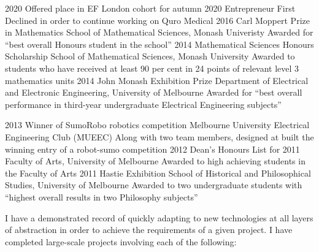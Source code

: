 \documentclass[9pt]{developercv} %
\newcommand{\CPP}
{C\nolinebreak[4]\hspace{-.05em}\raisebox{.22ex}{++ }}
\begin{document}
\begin{entrylist}
  \entry
    {2020}
    {Offered place in EF London cohort for autumn 2020}
    {Entrepreneur First}
    {Declined in order to continue working on Quro Medical}
  \entry
    {2016}
    {Carl Moppert Prize in Mathematics}
    {School of Mathematical Sciences, Monash Univeristy}
    {Awarded for ``best overall Honours student in the school''}
  \entry
    {2014}
    {Mathematical Sciences Honours Scholarship}
    {School of Mathematical Sciences, Monash University}
    {Awarded to students who have received at least 90 per cent in 24 points of relevant level 3 mathematics units}
  \entry
    {2014}
    {John Monash Exhibition Prize}
    {Department of Electrical and Electronic Engineering, University of Melbourne}
    {Awarded for ``best overall performance in third-year undergraduate Electrical Engineering subjects''}

  \entry
    {2013}
    {Winner of SumoRobo robotics competition}
    {Melbourne University Electrical Engineering Club (MUEEC)}
    {Along with two team members, designed at built the winning entry of a robot-sumo competition}
  \entry
    {2012}
    {Dean's Honours List for 2011}
    {Faculty of Arts, University of Melbourne}
    {Awarded to high achieving students in the Faculty of Arts}
  \entry
    {2011}
    {Hastie Exhibition}
    {School of Historical and Philosophical Studies, University of Melbourne}
    {Awarded to two undergraduate students with ``highest overall results in two Philosophy subjects''}
\end{entrylist}


I have a demonstrated record of quickly adapting to new technologies at all layers of abstraction in order to achieve the requirements of a given project.
I have completed large-scale projects involving each of the following:

\vspace{.25cm}


\end{document}
